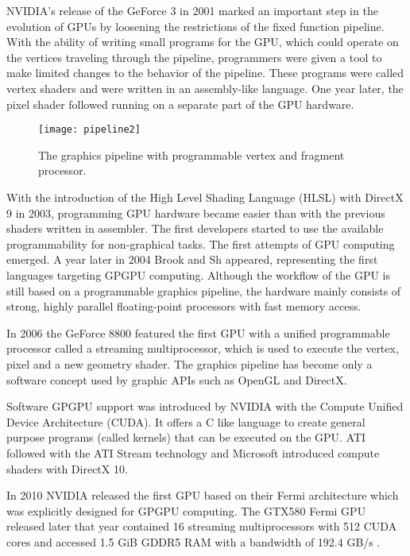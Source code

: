 NVIDIA's release of the GeForce 3 in 2001 marked an important step in the evolution of GPUs by loosening the restrictions of the fixed function pipeline. With the ability of writing small programs for the GPU, which could operate on the vertices traveling through the pipeline, programmers were given a tool to make limited changes to the behavior of the pipeline. These programs were called vertex shaders and were written in an assembly-like language. One year later, the pixel shader followed running on a separate part of the GPU hardware.

\begin{figure} %
\centering
\texttt{[image: pipeline2]}
\caption{The graphics pipeline with programmable vertex and fragment processor. \cite{cg_book}}
\label{fig:pipeline2}
\end{figure}

With the introduction of the High Level Shading Language (HLSL) with DirectX 9 in 2003, programming GPU hardware became easier than with the previous shaders written in assembler. The first developers started to use the available programmability for non-graphical tasks. The first attempts of GPU computing emerged. A year later in 2004 Brook and Sh appeared, representing the first languages targeting GPGPU computing.
Although the workflow of the GPU is still based on a programmable graphics pipeline, the hardware mainly consists of strong, highly parallel floating-point processors with fast memory access.

In 2006 the GeForce 8800 featured the first GPU with a unified programmable processor called a streaming multiprocessor, which is used to execute the vertex, pixel and a new geometry shader. The graphics pipeline has become only a software concept used by graphic APIs such as OpenGL and DirectX.

Software GPGPU support was introduced by NVIDIA with the Compute Unified Device Architecture (CUDA). It offers a C like language to create general purpose programs (called kernels) that can be executed on the GPU. ATI followed with the ATI Stream technology and Microsoft introduced compute shaders with DirectX 10.

In 2010 NVIDIA released the first GPU based on their Fermi architecture which was explicitly designed for GPGPU computing. The GTX580 Fermi GPU released later that year contained 16 streaming multiprocessors with 512 CUDA cores and accessed 1.5 GiB GDDR5 RAM with a bandwidth of 192.4 GB/s \cite{gtx580_spec}.

